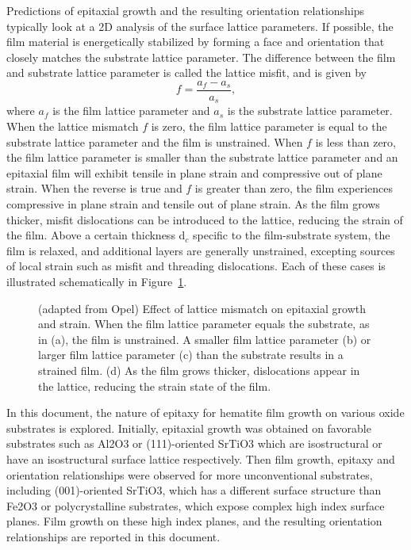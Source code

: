\documentclass[12pt,%
              twoside,
               letterpaper]{uiothesis}
\begin{document}
Predictions of epitaxial growth and the resulting orientation relationships typically look
at a 2\textsc{D} analysis of the surface lattice parameters. If possible, the film
material is energetically stabilized by forming a face and orientation that closely
matches the substrate lattice parameter. The difference between the film and substrate
lattice parameter is called the lattice misfit, and is given by 
\begin{equation}
f=\frac{a_{f}-a_{s}}{a_{s}},
\end{equation}
where $a_{f}$ is the film lattice parameter and $a_{s}$ is the substrate lattice
parameter.\cite{Opel:2012ge} When the lattice mismatch $f$ is zero, the film lattice
parameter is equal to the substrate lattice parameter and the film is unstrained. When $f$
is less than zero, the film lattice parameter is smaller than the substrate lattice
parameter and an epitaxial film will exhibit tensile in plane strain and compressive out
of plane strain. When the reverse is true and $f$ is greater than zero, the film
experiences compressive in plane strain and tensile out of plane strain. As the film grows
thicker, misfit dislocations can be introduced to the lattice, reducing the strain of the
film. Above a certain thickness d$_{c}$ specific to the film-substrate system, the film is
relaxed, and additional layers are generally unstrained, excepting sources of local strain
such as misfit and threading dislocations. Each of these cases is illustrated
schematically in Figure~\ref{fig:filmgrowth}.
\begin{figure}
		\caption[Strain in thin film growth]{%
			(adapted from Opel\citep{Opel:2012ge}) Effect of lattice mismatch 
			on epitaxial growth and strain.
			When the film lattice parameter equals the substrate, as in (a),
			the film is unstrained. A smaller film lattice parameter (b) or
			larger film lattice parameter (c) than the substrate results in
			a strained film. (d) As the film grows thicker, dislocations appear
			in the lattice, reducing the strain state of the film.}
	\label{fig:filmgrowth}
\end{figure}

In this document, the nature of epitaxy for hematite film growth on various oxide
substrates is explored. Initially, epitaxial growth was obtained on favorable substrates
such as Al2O3 or (111)-oriented SrTiO3 which are isostructural or have an
isostructural surface lattice respectively. Then film growth, epitaxy and orientation
relationships were observed for more unconventional substrates, including (001)-oriented
SrTiO3, which has a different surface structure than Fe2O3 or polycrystalline
substrates, which expose complex high index surface planes. Film growth on these high
index planes, and the resulting orientation relationships are reported in this document.
\end{document}

